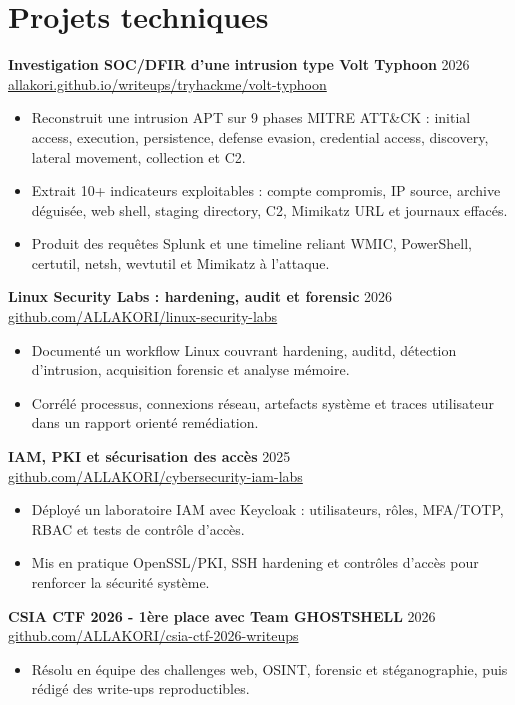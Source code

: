 \documentclass[10pt,a4paper]{article}
\begin{document}
\section{Projets techniques}
\textbf{Investigation SOC/DFIR d'une intrusion type Volt Typhoon} \hfill 2026\\
\href{https://allakori.github.io/writeups/posts/volt-typhoon-intrusion/}{allakori.github.io/writeups/tryhackme/volt-typhoon}
\begin{itemize}
  \item Reconstruit une intrusion APT sur 9 phases MITRE ATT\&CK : initial access, execution, persistence, defense evasion, credential access, discovery, lateral movement, collection et C2.
  \item Extrait 10+ indicateurs exploitables : compte compromis, IP source, archive déguisée, web shell, staging directory, C2, Mimikatz URL et journaux effacés.
  \item Produit des requêtes Splunk et une timeline reliant WMIC, PowerShell, certutil, netsh, wevtutil et Mimikatz à l'attaque.
\end{itemize}

\textbf{Linux Security Labs : hardening, audit et forensic} \hfill 2026\\
\href{https://github.com/ALLAKORI/linux-security-labs}{github.com/ALLAKORI/linux-security-labs}
\begin{itemize}
  \item Documenté un workflow Linux couvrant hardening, auditd, détection d'intrusion, acquisition forensic et analyse mémoire.
  \item Corrélé processus, connexions réseau, artefacts système et traces utilisateur dans un rapport orienté remédiation.
\end{itemize}

\textbf{IAM, PKI et sécurisation des accès} \hfill 2025\\
\href{https://github.com/ALLAKORI/cybersecurity-iam-labs}{github.com/ALLAKORI/cybersecurity-iam-labs}
\begin{itemize}
  \item Déployé un laboratoire IAM avec Keycloak : utilisateurs, rôles, MFA/TOTP, RBAC et tests de contrôle d'accès.
  \item Mis en pratique OpenSSL/PKI, SSH hardening et contrôles d'accès pour renforcer la sécurité système.
\end{itemize}

\textbf{CSIA CTF 2026 - 1ère place avec Team GHOSTSHELL} \hfill 2026\\
\href{https://github.com/ALLAKORI/csia-ctf-2026-writeups}{github.com/ALLAKORI/csia-ctf-2026-writeups}
\begin{itemize}
  \item Résolu en équipe des challenges web, OSINT, forensic et stéganographie, puis rédigé des write-ups reproductibles.
\end{itemize}
\end{document}
